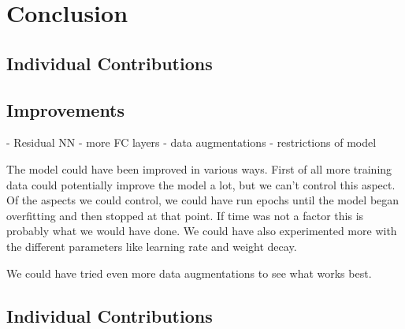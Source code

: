 \section{Conclusion}



\subsection{Individual Contributions}


\subsection{Improvements}
- Residual NN - more FC layers
- data augmentations
- restrictions of model

The model could have been improved in various ways. First of all more training data could potentially improve the model a lot, but we can't control this aspect.
Of the aspects we could control, we could have run epochs until the model began overfitting and then stopped at that point. If time was not a factor this is probably what we would have done. We could have also experimented more with the different parameters like learning rate and weight decay. 

We could have tried even more data augmentations to see what works best.

\subsection{Individual Contributions}